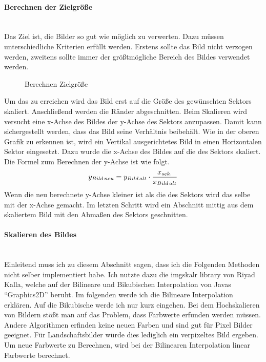 \newpage

\paragraph{Berechnen der Zielgröße}\mbox{}\\
Das Ziel ist, die Bilder so gut wie möglich zu verwerten. Dazu müssen unterschiedliche Kriterien erfüllt werden. Erstens sollte das Bild nicht verzogen werden, zweitens sollte immer der größtmögliche Bereich des Bildes verwendet werden.

\begin{figure}[h]
    \centering
    \fontsize{12pt}{12pt}\selectfont%
    \def\svgwidth{12cm}
    
    \caption[Berechnen Zielgröße]{Berechnen Zielgröße}
\end{figure}

Um das zu erreichen wird das Bild erst auf die Größe des gewünschten Sektors skaliert. Anschließend werden die Ränder abgeschnitten. Beim Skalieren wird versucht eine x-Achse des Bildes der y-Achse des Sektors anzupassen. Damit kann sichergestellt werden, dass das Bild seine Verhältnis beibehält. Wie in der oberen Grafik zu erkennen ist, wird ein Vertikal ausgerichtetes Bild in einen Horizontalen Sektor eingesetzt. Dazu wurde die x-Achse des Bildes auf die des Sektors skaliert. Die Formel zum Berechnen der y-Achse ist wie folgt.
\begin{align}
    y_\mathnormal{Bild\,neu}=y_\mathnormal{Bild\,alt} \cdot \frac{x_\mathnormal{sek.}}{x_\mathnormal{Bild\,alt}}
\end{align}    
Wenn die neu berechnete y-Achse kleiner ist als die des Sektors wird das selbe mit der x-Achse gemacht. Im letzten Schritt wird ein Abschnitt mittig aus dem skaliertem Bild mit den Abmaßen des Sektors geschnitten.

\newpage

\paragraph{Skalieren des Bildes}\mbox{}\\
Einleitend muss ich zu diesem Abschnitt sagen, dass ich die Folgenden Methoden nicht selber implementiert habe. Ich nutzte dazu die imgskalr library von Riyad Kalla, welche auf der Bilineare und Bikubischen Interpolation von Javas ``Graphics2D'' beruht. Im folgenden werde ich die Bilineare Interpolation erklären. Auf die Bikubische werde ich nur kurz eingehen.
\medskip
\newline
Bei dem Hochskalieren von Bildern stößt man auf das Problem, dass Farbwerte erfunden werden müssen. Andere Algorithmen erfinden keine neuen Farben und sind gut für Pixel Bilder geeignet. Für Landschaftsbilder würde dies lediglich ein verpixeltes Bild ergeben. Um neue Farbwerte zu Berechnen, wird bei der Bilinearen Interpolation linear Farbwerte berechnet.

